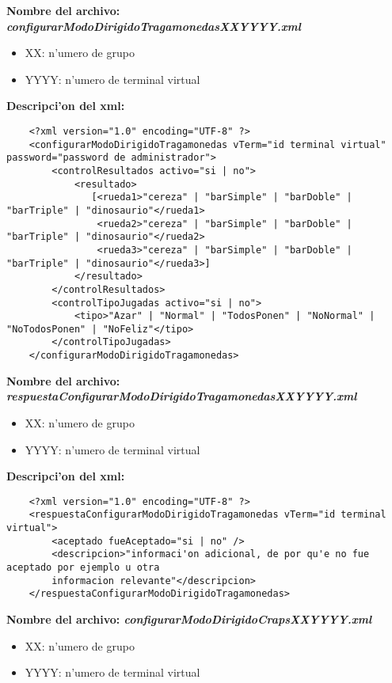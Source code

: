 \bf{Nombre del archivo:} \it{configurarModoDirigidoTragamonedasXXYYYY.xml}
\begin{itemize}
    \item{XX: n'umero de grupo}
    \item{YYYY: n'umero de terminal virtual}
\end{itemize}

\bf{Descripci'on del xml:}
\begin{verbatim}
    <?xml version="1.0" encoding="UTF-8" ?>
    <configurarModoDirigidoTragamonedas vTerm="id terminal virtual" password="password de administrador">
        <controlResultados activo="si | no">
            <resultado>
               [<rueda1>"cereza" | "barSimple" | "barDoble" | "barTriple" | "dinosaurio"</rueda1>
                <rueda2>"cereza" | "barSimple" | "barDoble" | "barTriple" | "dinosaurio"</rueda2>
                <rueda3>"cereza" | "barSimple" | "barDoble" | "barTriple" | "dinosaurio"</rueda3>]
            </resultado>
        </controlResultados>
        <controlTipoJugadas activo="si | no">
            <tipo>"Azar" | "Normal" | "TodosPonen" | "NoNormal" | "NoTodosPonen" | "NoFeliz"</tipo>
        </controlTipoJugadas>
    </configurarModoDirigidoTragamonedas>
\end{verbatim}


\bf{Nombre del archivo:} \it{respuestaConfigurarModoDirigidoTragamonedasXXYYYY.xml}
\begin{itemize}
    \item{XX: n'umero de grupo}
    \item{YYYY: n'umero de terminal virtual}
\end{itemize}

\bf{Descripci'on del xml:}
\begin{verbatim}
    <?xml version="1.0" encoding="UTF-8" ?>
    <respuestaConfigurarModoDirigidoTragamonedas vTerm="id terminal virtual">
        <aceptado fueAceptado="si | no" />
        <descripcion>"informaci'on adicional, de por qu'e no fue aceptado por ejemplo u otra
        informacion relevante"</descripcion>
    </respuestaConfigurarModoDirigidoTragamonedas>
\end{verbatim}


\bf{Nombre del archivo:} \it{configurarModoDirigidoCrapsXXYYYY.xml}
\begin{itemize}
    \item{XX: n'umero de grupo}
    \item{YYYY: n'umero de terminal virtual}
\end{itemize}

